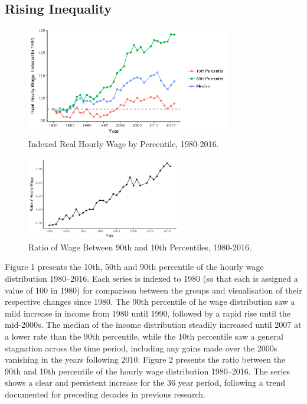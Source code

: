 \documentclass[notitlepage,12pt]{article}
\begin{document}
\subsection{Rising Inequality}
\begin{figure}[H]
  \centering
  \caption{Indexed Real Hourly Wage by Percentile, 1980-2016.}
  \includegraphics[width=0.8\textwidth]{Ineq_graph.png}
\end{figure}
\begin{figure}[b]
  \centering
  \caption{Ratio of Wage Between 90th and 10th Percentiles, 1980-2016.}
  \includegraphics[width=0.6\textwidth]{Ratio_plot1.png}
\end{figure}
Figure 1 presents the 10th, 50th and 90th percentile of the hourly wage distribution 1980--2016.  Each series is indexed to 1980 (so that each is assigned a value of 100 in 1980) for comparison between the groups and visualisation of their respective changes since 1980.  The 90th percentile of he wage distribution saw a mild increase in income from 1980 until 1990, followed by a rapid rise until the mid-2000s.  The median of the income distribution steadily increased until 2007 at a lower rate than the 90th percentile, while the 10th percentile saw a general stagnation across the time period, including any gains made over the 2000s vanishing in the years following 2010.  Figure 2 presents the ratio between the 90th and 10th percentile of the hourly wage distribution 1980--2016.  The series shows a clear and persistent increase for the 36 year period, following a trend documented for preceding decades in previous research.
\end{document}
